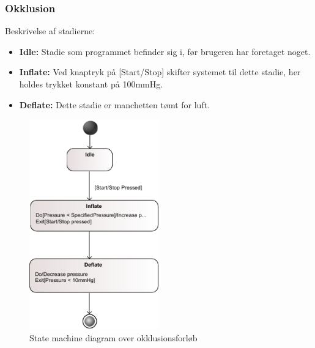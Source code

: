 \subsubsection{Okklusion}
Beskrivelse af stadierne:
\begin{itemize}
	\item \textbf{Idle:} Stadie som programmet befinder sig i, før brugeren har foretaget noget.
	\item \textbf{Inflate:} Ved knaptryk på [Start/Stop] skifter systemet til dette stadie, her holdes trykket konstant på 100mmHg.
	\item \textbf{Deflate:} Dette stadie er manchetten tømt for luft.
\end{itemize}
	\begin{figure}[H]
		\begin{center}
		\includegraphics[width=0.5\textwidth]{pdfs/STM_Okklusion-crop.pdf}
		\caption{State machine diagram over okklusionsforløb}
	\end{center}
	\end{figure}

\newpage

